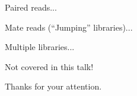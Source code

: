 

 {
Paired reads...

\pause
Mate reads (``Jumping'' libraries)...

\pause
Multiple libraries...

\pause
\vspace{2cm} Not covered in this talk!
}

\fr{} {
Thanks for your attention.
}



